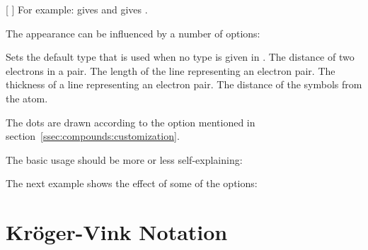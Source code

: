 \documentclass[load-preamble+]{cnltx-doc}
\begin{document}
\begin{commands}
  [%
    ]
    For example:  gives  and
     gives
    .
\end{commands}

The appearance can be influenced by a number of options:
\begin{options}
    Sets the default type that is used when no type is given in .
  \Default{1ex}
    The distance of two electrons in a pair.
  \Default{1.5ex}
    The length of the line representing an electron pair.
  \Default{1pt}
    The thickness of a line representing an electron pair.
  \Default{.5ex}
    The distance of the symbols from the atom.
\end{options}
The dots are drawn according to the  option mentioned
in section~\ref{ssec:compounds:customization}.

The basic usage should be more or less self-explaining:
\begin{example}
  \quad
  \quad
\end{example}

The next example shows the effect of some of the options:
\begin{example}
  \quad
  \quad
  \quad
  \quad
\end{example}

\begin{example}
\end{example}

\section{Kröger-Vink Notation}\label{sec:kroger-vink-notation}
\end{document}
